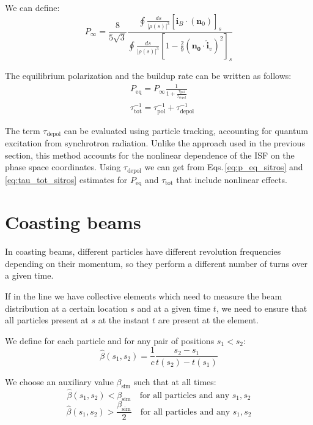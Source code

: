 We can define:
\begin{equation}
  P_{\infty} = \frac{8}{5\sqrt{3}}
  \frac
  {
   \oint \frac{ds}{|\rho(s)|^3}
    \left[\hat{\bm{i}}_B \cdot
    (\bm{n}_0)
    \right]_s
}
{
  \oint \frac{ds}{|\rho(s)|^3}
  \left[
    1 - \frac{2}{9} (\bm{n_0} \cdot \hat{\bm{i}}_v)^2
    \right]_s
}
\end{equation}

The equilibrium polarization and the buildup rate can be written as follows:
\begin{align}
  &P_\text{eq} = P_{\infty} \frac{1}{1 + \frac{\tau_\text{pol}}{\tau_\text{depol}}}
  \label{eq:p_eq_sitros}\\
  &\tau_\text{tot}^{-1} = \tau_\text{pol}^{-1} + \tau_\text{depol}^{-1}
  \label{eq:tau_tot_sitros}
\end{align}

The term $\tau_\text{depol}$ can be evaluated using particle tracking, accounting for
quantum excitation from synchrotron radiation. Unlike the approach used in the previous
section, this method accounts for the nonlinear dependence of the ISF on the phase space coordinates.
Using $\tau_\text{depol}$ we can get from Eqs.\,\ref{eq:p_eq_sitros} and \ref{eq:tau_tot_sitros}
estimates for $P_\text{eq}$ and $\tau_\text{tot}$ that include nonlinear effects.


\chapter{Coasting beams}

In coasting beams, different particles have different revolution frequencies depending on their momentum, so they perform a different number of turns over a given time.

If in the line we have collective elements which need to measure the beam distribution at a certain location $s$ and at a given time $t$, we need to ensure that all particles present at $s$ at the instant $t$ are present at the element.

We define for each particle and for any pair of positions $s_1 < s_2$:
\begin{equation}
\hat{\beta}(s_1, s_2) = \frac{1}{c}\frac{s_2-s_1}{t(s_2) - t(s_1)}
\end{equation}

We choose an auxiliary value $\beta_\text{sim}$ such that at all times:
\begin{equation}
\hat{\beta}(s_1, s_2) < \beta_\text{sim} \quad \text{for all particles and any } s_1, s_2
\label{eq:betasim1}
\end{equation}
\begin{equation}
\hat{\beta}(s_1, s_2) > \frac{\beta_\text{sim}}{2}\quad \text{for all particles and any } s_1, s_2
\label{eq:betasim2}
\end{equation}

